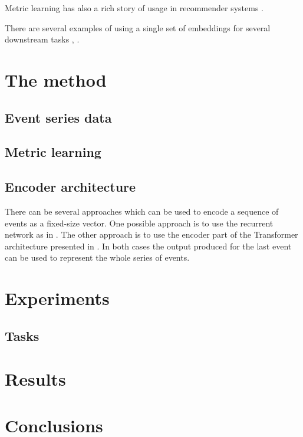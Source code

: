 \documentclass[sigconf]{acmart}
\begin{document}
Metric learning has also a rich story of usage in recommender systems \cite{Hsieh:2017:CML:3038912.3052639}.

There are several examples of using a single set of embeddings for several downstream tasks \cite{Song2017LearningUE}, \cite{Zhai:2019:LUE:3292500.3330739}.

\section{The method}

\subsection{Event series data}

\subsection{Metric learning}

\subsection{Encoder architecture}

There can be several approaches which can be used to encode a sequence of events as a fixed-size vector. One possible approach is to use the recurrent network as in \cite{Sutskever:2014:SSL:2969033.2969173}. The other approach is to use the encoder part of the Transformer architecture presented in \cite{DBLP:journals/corr/VaswaniSPUJGKP17}. In both cases the output produced for the last event can be used to represent the whole series of events.

\section{Experiments} \label{sec-exp}
\subsection{Tasks} \label{sec-tasks}

\section{Results}

\section{Conclusions}



\end{document}
